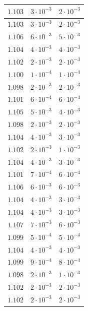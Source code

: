 \begin{table}[h]
\begin{tabular}{|c|c|c|}
       \hline
       $1.103$ & $3 \cdot 10^{-3}$ & $2 \cdot 10^{-3}$ \\
       \hline
       $1.103$ & $3 \cdot 10^{-3}$ & $2 \cdot 10^{-3}$ \\
       \hline
       $1.106$ & $6 \cdot 10^{-3}$ & $5 \cdot 10^{-3}$ \\
       \hline
       $1.104$ & $4 \cdot 10^{-3}$ & $4 \cdot 10^{-3}$ \\
       \hline
       $1.102$ & $2 \cdot 10^{-3}$ & $2 \cdot 10^{-3}$ \\
       \hline
       $1.100$ & $1 \cdot 10^{-4}$ & $1 \cdot 10^{-4}$ \\
       \hline
       $1.098$ & $2 \cdot 10^{-3}$ & $2 \cdot 10^{-3}$ \\
       \hline
       $1.101$ & $6 \cdot 10^{-4}$ & $6 \cdot 10^{-4}$ \\
       \hline
       $1.105$ & $5 \cdot 10^{-3}$ & $4 \cdot 10^{-3}$ \\
       \hline
       $1.098$ & $2 \cdot 10^{-3}$ & $2 \cdot 10^{-3}$ \\
       \hline
       $1.104$ & $4 \cdot 10^{-3}$ & $3 \cdot 10^{-3}$ \\
       \hline
       $1.102$ & $2 \cdot 10^{-3}$ & $1 \cdot 10^{-3}$ \\
       \hline
       $1.104$ & $4 \cdot 10^{-3}$ & $3 \cdot 10^{-3}$ \\
       \hline
       $1.101$ & $7 \cdot 10^{-4}$ & $6 \cdot 10^{-4}$ \\
       \hline
       $1.106$ & $6 \cdot 10^{-3}$ & $6 \cdot 10^{-3}$ \\
       \hline
       $1.104$ & $4 \cdot 10^{-3}$ & $3 \cdot 10^{-3}$ \\
       \hline
       $1.104$ & $4 \cdot 10^{-3}$ & $3 \cdot 10^{-3}$ \\
       \hline
       $1.107$ & $7 \cdot 10^{-3}$ & $6 \cdot 10^{-3}$ \\
       \hline
       $1.099$ & $5 \cdot 10^{-4}$ & $5 \cdot 10^{-4}$ \\
       \hline
       $1.104$ & $4 \cdot 10^{-3}$ & $4 \cdot 10^{-3}$ \\
       \hline
       $1.099$ & $9 \cdot 10^{-4}$ & $8 \cdot 10^{-4}$ \\
       \hline
       $1.098$ & $2 \cdot 10^{-3}$ & $1 \cdot 10^{-3}$ \\
       \hline
       $1.102$ & $2 \cdot 10^{-3}$ & $2 \cdot 10^{-3}$ \\
       \hline
       $1.102$ & $2 \cdot 10^{-3}$ & $2 \cdot 10^{-3}$ \\
       \hline
   \end{tabular}
\end{table}


